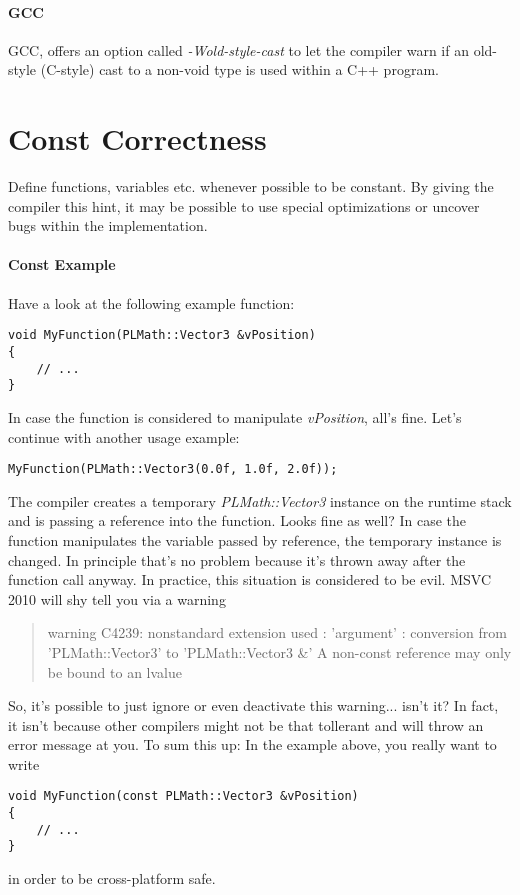 \paragraph{\ac{GCC}}
\ac{GCC}, offers an option called \emph{-Wold-style-cast} to let the compiler warn if an old-style (C-style) cast to a non-void type is used within a C++ program.




\section{Const Correctness}
Define functions, variables etc. whenever possible to be constant. By giving the compiler this hint, it may be possible to use special optimizations or uncover bugs within the implementation.


\paragraph{Const Example}
Have a look at the following example function:
\begin{lstlisting}[caption=Non-constant function parameter]
void MyFunction(PLMath::Vector3 &vPosition)
{
	// ...
}
\end{lstlisting}
In case the function is considered to manipulate \emph{vPosition}, all's fine. Let's continue with another usage example:
\begin{lstlisting}[caption=Using a temporary variable instance as non-constant function parameter]
MyFunction(PLMath::Vector3(0.0f, 1.0f, 2.0f));
\end{lstlisting}
The compiler creates a temporary \emph{PLMath::Vector3} instance on the runtime stack and is passing a reference into the function. Looks fine as well? In case the function manipulates the variable passed by reference, the temporary instance is changed. In principle that's no problem because it's thrown away after the function call anyway. In practice, this situation is considered to be evil. \ac{MSVC} 2010 will shy tell you via a warning
\begin{quote}warning C4239: nonstandard extension used : 'argument' : conversion from 'PLMath::Vector3' to 'PLMath::Vector3 \&' A non-const reference may only be bound to an lvalue\end{quote}
So, it's possible to just ignore or even deactivate this warning... isn't it? In fact, it isn't because other compilers might not be that tollerant and will throw an error message at you. To sum this up: In the example above, you really want to write
\begin{lstlisting}[caption=Constant function parameter]
void MyFunction(const PLMath::Vector3 &vPosition)
{
	// ...
}
\end{lstlisting}
in order to be cross-platform safe.


